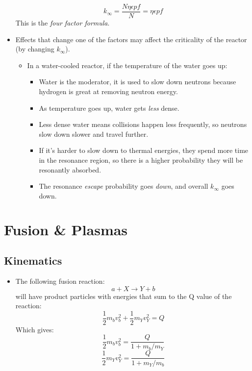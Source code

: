 \documentclass[letter]{article}
\begin{document}
\begin{itemize}
  \begin{equation*}
    k_\infty = \frac{N\eta\epsilon{}pf}{N} = \eta\epsilon{}pf
  \end{equation*}
This is the \textit{four factor formula}.~\cite[pp. 503]{krane}
\item Effects that change one of the factors may affect the
  criticality of the reactor (by changing $k_\infty$).
  \begin{itemize}
  \item In a water-cooled reactor, if the temperature of the water
    goes up:
    \begin{itemize}
    \item Water is the moderator, it is used to slow down neutrons
      because hydrogen is great at removing neutron energy.
    \item As temperature goes up, water gets \textit{less} dense.
    \item Less dense water means collisions happen less frequently, so
      neutrons slow down slower and travel further.
    \item If it's harder to slow down to thermal energies, they spend
      more time in the resonance region, so there is a higher
      probability they will be resonantly absorbed.
    \item The resonance \textit{escape} probability goes
      \textit{down}, and overall $k_\infty$ goes down.
    \end{itemize}
  \end{itemize}
\end{itemize}
\section{Fusion \& Plasmas}

\subsection{Kinematics}
\begin{itemize}
\item The following fusion reaction:
  \begin{equation*}
    a + X \to Y + b
  \end{equation*}
will have product particles with energies that sum to the Q value of
the reaction:
\begin{equation*}
  \frac{1}{2}m_bv_b^2+\frac{1}{2}m_Yv^2_Y = Q
\end{equation*}
Which gives:
\begin{equation*}
  \frac{1}{2}m_bv^2_b = \frac{Q}{1+m_b/m_Y}
\end{equation*}
\begin{equation*}
  \frac{1}{2}m_Yv^2_Y = \frac{Q}{1+m_Y/m_b}
\end{equation*}
\cite[pp. 531]{krane}
\end{itemize}
\end{document}
